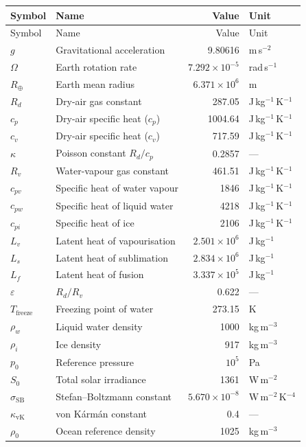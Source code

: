 \documentclass[11pt,twoside]{report}
\newcommand{\Rd}{R_d}
\newcommand{\cpd}{c_p}
\newcommand{\cvd}{c_v}
\newcommand{\Lv}{L_v}
\newcommand{\Ls}{L_s}
\newcommand{\Lf}{L_f}
\newcommand{\Rv}{R_v}
\newcommand{\pref}{p_0}
\newcommand{\SB}{\sigma_{\mathrm{SB}}}
\begin{document}
\begin{center}
\begin{longtable}{llrl}
\toprule
Symbol & Name & Value & Unit \\
\midrule
\endfirsthead
\toprule
Symbol & Name & Value & Unit \\
\midrule
\endhead
$g$ & Gravitational acceleration & 9.80616 & m\,s$^{-2}$ \\
$\Omega$ & Earth rotation rate & $7.292\times10^{-5}$ & rad\,s$^{-1}$ \\
$R_{\oplus}$ & Earth mean radius & $6.371\times10^6$ & m \\
$\Rd$ & Dry-air gas constant & 287.05 & J\,kg$^{-1}$\,K$^{-1}$ \\
$\cpd$ & Dry-air specific heat ($c_p$) & 1004.64 & J\,kg$^{-1}$\,K$^{-1}$ \\
$\cvd$ & Dry-air specific heat ($c_v$) & 717.59 & J\,kg$^{-1}$\,K$^{-1}$ \\
$\kappa$ & Poisson constant $\Rd/\cpd$ & 0.2857 & --- \\
$\Rv$ & Water-vapour gas constant & 461.51 & J\,kg$^{-1}$\,K$^{-1}$ \\
$c_{pv}$ & Specific heat of water vapour & 1846 & J\,kg$^{-1}$\,K$^{-1}$ \\
$c_{pw}$ & Specific heat of liquid water & 4218 & J\,kg$^{-1}$\,K$^{-1}$ \\
$c_{pi}$ & Specific heat of ice & 2106 & J\,kg$^{-1}$\,K$^{-1}$ \\
$\Lv$ & Latent heat of vapourisation & $2.501\times10^6$ & J\,kg$^{-1}$ \\
$\Ls$ & Latent heat of sublimation & $2.834\times10^6$ & J\,kg$^{-1}$ \\
$\Lf$ & Latent heat of fusion & $3.337\times10^5$ & J\,kg$^{-1}$ \\
$\varepsilon$ & $\Rd/\Rv$ & 0.622 & --- \\
$T_{\mathrm{freeze}}$ & Freezing point of water & 273.15 & K \\
$\rho_w$ & Liquid water density & 1000 & kg\,m$^{-3}$ \\
$\rho_i$ & Ice density & 917 & kg\,m$^{-3}$ \\
$\pref$ & Reference pressure & $10^5$ & Pa \\
$S_0$ & Total solar irradiance & 1361 & W\,m$^{-2}$ \\
$\SB$ & Stefan--Boltzmann constant & $5.670\times10^{-8}$ & W\,m$^{-2}$\,K$^{-4}$ \\
$\kappa_{\mathrm{vK}}$ & von K\'{a}rm\'{a}n constant & 0.4 & --- \\
$\rho_0$ & Ocean reference density & 1025 & kg\,m$^{-3}$ \\
\bottomrule
\end{longtable}
\end{center}
\end{document}
